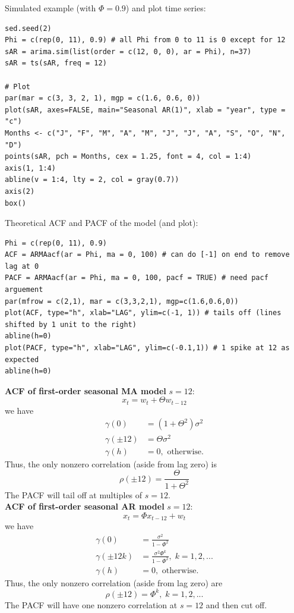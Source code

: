 \documentclass[11pt]{article}
\newcommand{\noi}{\noindent}
\begin{document}
\noi Simulated example (with $\Phi = 0.9$) and plot time series:
\begin{lstlisting}
sed.seed(2)
Phi = c(rep(0, 11), 0.9) # all Phi from 0 to 11 is 0 except for 12
sAR = arima.sim(list(order = c(12, 0, 0), ar = Phi), n=37)
sAR = ts(sAR, freq = 12)

# Plot
par(mar = c(3, 3, 2, 1), mgp = c(1.6, 0.6, 0))
plot(sAR, axes=FALSE, main="Seasonal AR(1)", xlab = "year", type = "c")
Months <- c("J", "F", "M", "A", "M", "J", "J", "A", "S", "O", "N", "D")
points(sAR, pch = Months, cex = 1.25, font = 4, col = 1:4)
axis(1, 1:4)
abline(v = 1:4, lty = 2, col = gray(0.7))
axis(2)
box()
\end{lstlisting}
\noi Theoretical ACF and PACF of the model (and plot):
\begin{lstlisting}
Phi = c(rep(0, 11), 0.9)
ACF = ARMAacf(ar = Phi, ma = 0, 100) # can do [-1] on end to remove lag at 0
PACF = ARMAacf(ar = Phi, ma = 0, 100, pacf = TRUE) # need pacf arguement
par(mfrow = c(2,1), mar = c(3,3,2,1), mgp=c(1.6,0.6,0))
plot(ACF, type="h", xlab="LAG", ylim=c(-1, 1)) # tails off (lines shifted by 1 unit to the right)
abline(h=0)
plot(PACF, type="h", xlab="LAG", ylim=c(-0.1,1)) # 1 spike at 12 as expected
abline(h=0)
\end{lstlisting}

\noi \textbf{ACF of first-order seasonal MA model} $s=12$:
$$x_t = w_t + \Theta w_{t-12}$$
\noi we have
\begin{align*}
    \gamma(0) &= (1 + \Theta^2)\sigma^2 \\
    \gamma(\pm12) &= \Theta \sigma^2 \\
    \gamma(h) &= 0, \text{ otherwise}.
\end{align*}
\noi Thus, the only nonzero correlation (aside from lag zero) is
$$\rho(\pm12) = \frac{\Theta}{1+\Theta^2}$$
\noi The PACF will tail off at multiples of $s=12$. \\

\noi \textbf{ACF of first-order seasonal AR model} $s=12$:
$$x_t = \Phi x_{t-12} + w_t$$
\noi we have
\begin{align*}
    \gamma(0) &= \frac{\sigma^2}{1 - \Phi^2} \\
    \gamma(\pm12k) &= \frac{\sigma^2\Phi^k}{1 - \Phi^2}, \; k=1,2,... \\
    \gamma(h) &= 0, \text{ otherwise}.
\end{align*}
\noi Thus, the only nonzero correlation (aside from lag zero) are
$$\rho(\pm12) = \Phi^k, \; k=1,2,...$$
\noi The PACF will have one nonzero correlation at $s=12$ and then cut off. \\
\end{document}
